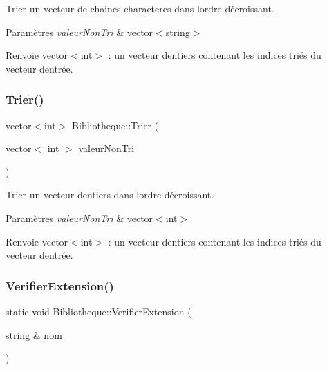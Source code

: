 Trier un vecteur de chaines characteres dans l\textquotesingle{}ordre décroissant. 


\begin{DoxyParams}{Paramètres}
{\em valeur\+Non\+Tri} & vector$<$string$>$ \\
\hline
\end{DoxyParams}
\begin{DoxyReturn}{Renvoie}
vector$<$int$>$ \+: un vecteur d\textquotesingle{}entiers contenant les indices triés du vecteur d\textquotesingle{}entrée. 
\end{DoxyReturn}
\mbox{\label{classBibliotheque_a0a0c1d628bfa840f764d4ec483f4b1e6}} 
\subsubsection{\texorpdfstring{Trier()}{Trier()}\hspace{0.1cm}{\footnotesize\ttfamily [4/4]}}
{\footnotesize\ttfamily vector$<$int$>$ Bibliotheque\+::\+Trier (\begin{DoxyParamCaption}\item[{vector$<$ int $>$}]{valeur\+Non\+Tri }\end{DoxyParamCaption})}



Trier un vecteur d\textquotesingle{}entiers dans l\textquotesingle{}ordre décroissant. 


\begin{DoxyParams}{Paramètres}
{\em valeur\+Non\+Tri} & vector$<$int$>$ \\
\hline
\end{DoxyParams}
\begin{DoxyReturn}{Renvoie}
vector$<$int$>$ \+: un vecteur d\textquotesingle{}entiers contenant les indices triés du vecteur d\textquotesingle{}entrée. 
\end{DoxyReturn}
\mbox{\label{classBibliotheque_a0756c71060d89b307c1a051fdeee6051}} 
\subsubsection{\texorpdfstring{Verifier\+Extension()}{VerifierExtension()}}
{\footnotesize\ttfamily static void Bibliotheque\+::\+Verifier\+Extension (\begin{DoxyParamCaption}\item[{string \&}]{nom }\end{DoxyParamCaption})\hspace{0.3cm}{\ttfamily [static]}}



